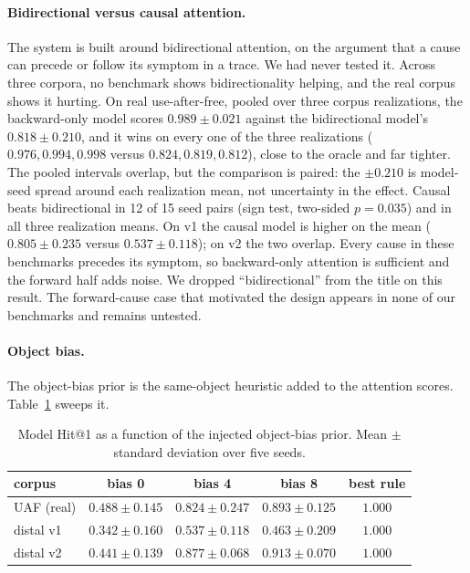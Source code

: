 \documentclass[11pt]{article}
\begin{document}
\paragraph{Bidirectional versus causal attention.}
The system is built around bidirectional attention, on the argument that a cause can precede or follow its symptom in a trace. We had never tested it. Across three corpora, no benchmark shows bidirectionality helping, and the real corpus shows it hurting. On real use-after-free, pooled over three corpus realizations, the backward-only model scores $0.989 \pm 0.021$ against the bidirectional model's $0.818 \pm 0.210$, and it wins on every one of the three realizations ($0.976, 0.994, 0.998$ versus $0.824, 0.819, 0.812$), close to the oracle and far tighter. The pooled intervals overlap, but the comparison is paired: the $\pm 0.210$ is model-seed spread around each realization mean, not uncertainty in the effect. Causal beats bidirectional in 12 of 15 seed pairs (sign test, two-sided $p = 0.035$) and in all three realization means. On v1 the causal model is higher on the mean ($0.805 \pm 0.235$ versus $0.537 \pm 0.118$); on v2 the two overlap. Every cause in these benchmarks precedes its symptom, so backward-only attention is sufficient and the forward half adds noise. We dropped ``bidirectional'' from the title on this result. The forward-cause case that motivated the design appears in none of our benchmarks and remains untested.

\paragraph{Object bias.}
The object-bias prior is the same-object heuristic added to the attention scores. Table~\ref{tab:bias} sweeps it.

\begin{table}[t]
  \centering
  \caption{Model Hit@1 as a function of the injected object-bias prior. Mean $\pm$ standard deviation over five seeds.}
  \label{tab:bias}
  \begin{tabular}{lcccc}
    \toprule
    corpus & bias 0 & bias 4 & bias 8 & best rule \\
    \midrule
    UAF (real) & $0.488 \pm 0.145$ & $0.824 \pm 0.247$ & $0.893 \pm 0.125$ & $1.000$ \\
    distal v1 & $0.342 \pm 0.160$ & $0.537 \pm 0.118$ & $0.463 \pm 0.209$ & $1.000$ \\
    distal v2 & $0.441 \pm 0.139$ & $0.877 \pm 0.068$ & $0.913 \pm 0.070$ & $1.000$ \\
    \bottomrule
  \end{tabular}
\end{table}
\end{document}
